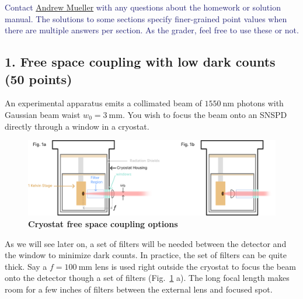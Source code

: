 \documentclass[11pt]{caltech_thesis} %
\begin{document}
\textcolor{midnightblue}{Contact \href{mailto:andrewstermueller@gmail.com}{Andrew Mueller} with any questions about the homework or solution manual. The solutions to some sections specify finer-grained point values when there are multiple answers per section. As the grader, feel free to use these or not. }

\hypertarget{free-space-coupling-with-low-dark-counts-50-points}{%
\subsection{1. Free space coupling with low dark counts (50 points)}\label{free-space-coupling-with-low-dark-counts-50-points}}

An experimental apparatus emits a collimated beam of $1550~\mathrm{nm}$ photons with Gaussian beam waist $w_0 = 3~\mathrm{mm}$. You wish to focus the beam onto an SNSPD directly through a window in a cryostat.

\hypertarget{fig:cryostat_concept}{%
\begin{figure}
\centering
\includegraphics{./chapter_07/figs/fig1b_light.pdf}
\caption[{Cryostat free space coupling options}]{\textbf{Cryostat free space coupling options}}
\label{fig:cryostat_concept}
\end{figure}
}

As we will see later on, a set of filters will be needed between the detector and the window to minimize dark counts. In practice, the set of filters can be quite thick. Say a $f = 100~\mathrm{mm}$ lens is used right outside the cryostat to focus the beam onto the detector though a set of filters (Fig.~\ref{fig:cryostat_concept} a). The long focal length makes room for a few inches of filters between the external lens and focused spot.
\end{document}
